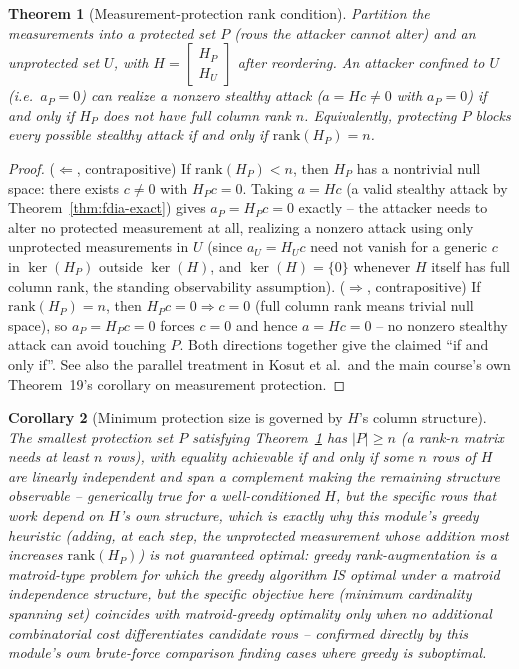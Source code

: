 \documentclass[11pt]{report}
\theoremstyle{plain}
\newtheorem{theorem}{Theorem}[chapter]
\newtheorem{corollary}[theorem]{Corollary}
\theoremstyle{definition}
\theoremstyle{remark}
\begin{document}
\begin{theorem}[Measurement-protection rank condition]
\label{thm:protection-rank}
Partition the measurements into a protected set $P$ (rows the attacker
cannot alter) and an unprotected set $U$, with $H=\begin{bmatrix}H_P\\
H_U\end{bmatrix}$ after reordering. An attacker confined to $U$ (i.e.\
$a_P=0$) can realize a nonzero stealthy attack ($a=Hc\ne0$ with
$a_P=0$) if and only if $H_P$ does \emph{not} have full column rank $n$.
Equivalently, protecting $P$ blocks \emph{every} possible stealthy
attack if and only if $\text{rank}(H_P)=n$.
\end{theorem}
\begin{proof}
($\Leftarrow$, contrapositive) If $\text{rank}(H_P)<n$, then $H_P$ has
a nontrivial null space: there exists $c\ne0$ with $H_Pc=0$. Taking
$a=Hc$ (a valid stealthy attack by Theorem~\ref{thm:fdia-exact}) gives
$a_P=H_Pc=0$ exactly -- the attacker needs to alter no protected
measurement at all, realizing a nonzero attack using only unprotected
measurements in $U$ (since $a_U=H_Uc$ need not vanish for a generic
$c$ in $\ker(H_P)$ outside $\ker(H)$, and $\ker(H)=\{0\}$ whenever $H$
itself has full column rank, the standing observability assumption).
($\Rightarrow$, contrapositive) If $\text{rank}(H_P)=n$, then
$H_Pc=0\Rightarrow c=0$ (full column rank means trivial null space), so
$a_P=H_Pc=0$ forces $c=0$ and hence $a=Hc=0$ -- no nonzero stealthy
attack can avoid touching $P$. Both directions together give the
claimed ``if and only if''. See also the parallel treatment in
Kosut et al.\ and the main course's own Theorem~19's corollary on
measurement protection.
\end{proof}

\begin{corollary}[Minimum protection size is governed by $H$'s column structure]
\label{cor:min-protection}
The smallest protection set $P$ satisfying Theorem~\ref{thm:protection-rank}
has $\left|P\right|\ge n$ (a rank-$n$ matrix needs at least $n$ rows), with
equality achievable if and only if some $n$ rows of $H$ are linearly
independent and span a complement making the remaining structure
observable -- generically true for a well-conditioned $H$, but the
\emph{specific} rows that work depend on $H$'s own structure, which is
exactly why this module's greedy heuristic (adding, at each step, the
unprotected measurement whose addition most increases $\text{rank}
(H_P)$) is not guaranteed optimal: greedy rank-augmentation is a
matroid-type problem for which the greedy algorithm IS optimal under a
matroid independence structure, but the \emph{specific} objective here
(minimum cardinality spanning set) coincides with matroid-greedy
optimality only when no additional combinatorial cost differentiates
candidate rows -- confirmed directly by this module's own brute-force
comparison finding cases where greedy is suboptimal.
\end{corollary}
\end{document}
